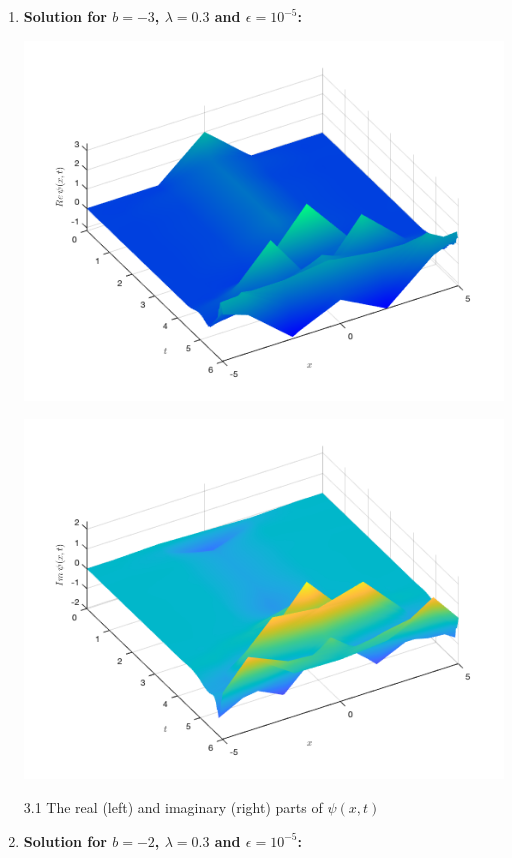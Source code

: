 \documentclass[12pt, letterpaper, twoside]{article}
\begin{document}
\begin{enumerate}[label=(\roman*)]
    \item \textbf{Solution for $b=-3$, $\lambda=0.3$ and $\epsilon=10^{-5}$:}
    
    \begin{multicols}{2}
        \begin{center}
            \includegraphics[scale=0.35]{with friction/(b-3real).png}
        \end{center} 
        \begin{center}
            \includegraphics[scale=0.35]{with friction/(b-3imag).png}
        \end{center}  
    \end{multicols}
    \figurename{ 3.1 The real (left) and imaginary (right) parts of $\psi(x, t)$}
    \newpage
    \item \textbf{Solution for $b=-2$, $\lambda=0.3$ and $\epsilon=10^{-5}$:}
    

\end{enumerate}
\end{document}
